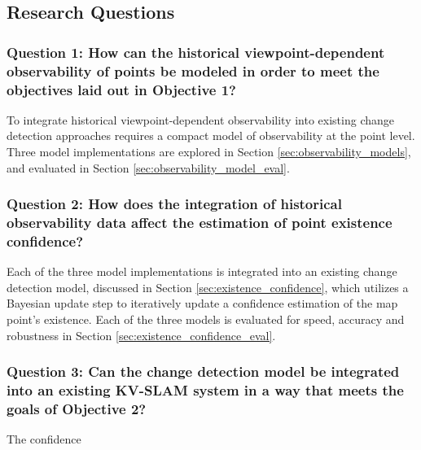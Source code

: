 \subsection{Research Questions}

\subsubsection*{Question 1: How can the historical viewpoint-dependent observability of points be modeled in order to meet the objectives laid out in Objective 1?}

To integrate historical viewpoint-dependent observability into existing change detection approaches requires a compact model of observability at the point level. Three model implementations are explored in Section \ref{sec:observability_models}, and evaluated in Section \ref{sec:observability_model_eval}.

\subsubsection*{Question 2: How does the integration of historical observability data affect the estimation of point existence confidence?}

Each of the three model implementations is integrated into an existing change detection model, discussed in Section \ref{sec:existence_confidence}, which utilizes a Bayesian update step to iteratively update a confidence estimation of the map point's existence. Each of the three models is evaluated for speed, accuracy and robustness in Section \ref{sec:existence_confidence_eval}.

\subsubsection*{Question 3: Can the change detection model be integrated into an existing KV-SLAM system in a way that meets the goals of Objective 2?}

The confidence